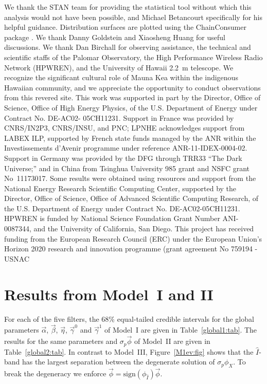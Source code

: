 \documentclass[trackchanges]{aastex62}   	%
\begin{document}
\acknowledgments
We thank the STAN team for providing the statistical tool without which this analysis would not have been possible,
and Michael Betancourt specifically for his helpful guidance.  
Distribution surfaces are plotted using the ChainConsumer package \citep{Hinton2016}.
We thank Danny Goldstein and
Xiaosheng Huang for useful discussions.
We thank Dan Birchall for observing assistance, the technical and
scientific staffs of the Palomar Observatory, the High Performance
Wireless Radio Network (HPWREN), and the University of Hawaii 2.2~m
telescope.  We recognize the significant cultural role of Mauna Kea
within the indigenous Hawaiian community, and we appreciate the
opportunity to conduct observations from this revered site.  This
work was supported in part by the Director, Office of Science,
Office of High Energy Physics, of the U.S. Department of Energy
under Contract No. DE-AC02- 05CH11231.  Support in France was
provided by CNRS/IN2P3, CNRS/INSU, and PNC; LPNHE acknowledges
support from LABEX ILP, supported by French state funds managed by
the ANR within the Investissements d'Avenir programme under reference
ANR-11-IDEX-0004-02.  Support in Germany was provided by the DFG
through TRR33 ``The Dark Universe;'' and in China from Tsinghua
University 985 grant and NSFC grant No~11173017.  Some results were
obtained using resources and support from the National Energy
Research Scientific Computing Center, supported by the Director,
Office of Science, Office of Advanced Scientific Computing Research,
of the U.S. Department of Energy under Contract No. DE-AC02-05CH11231.
HPWREN is funded by National Science Foundation Grant Number
ANI-0087344, and the University of California, San Diego.
This project has received funding from the European Research Council (ERC) under the European Union's Horizon 2020 research and innovation programme (grant agreement No 759194 - USNAC 

\appendix
\section{Results from Model~I and II}
\label{m12results:sec}
For each of the five filters, the 68\%  equal-tailed credible intervals for the global parameters $\vec{\alpha}$, $\vec{\beta}$, $\vec{\eta}$,
$\vec{\gamma}^0$ and $\vec{\gamma}^1$ of Model~I are given in  Table~\ref{global1:tab}.
The results for the same parameters and $\sigma_p\vec{\phi}$
of Model~II are given in Table~\ref{global2:tab}.  In contrast to Model~III,
Figure~\ref{M1ev:fig} shows that the $\hat{I}$-band has
the largest separation between the degenerate solution of $\sigma_p \phi_X$.  To break the degeneracy we enforce 
$\vec{\phi} = \text{sign}(\phi_{\hat{I}}) \vec{\phi}$.
\end{document}
